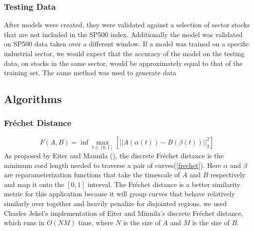 \documentclass{article}
\begin{document}
\subsubsection{Testing Data}
After models were created, they were validated against a selection of sector stocks that are not included in the  SP500 index. Additionally the model was validated on SP500 data taken over a different window. If a model was trained on a specific industrial sector, we would expect that the accuracy of the model on the testing data, on stocks in the same sector, would be approximately equal to that of the training set. The same method was used to generate data 

\subsection{Algorithms}
\subsubsection{Fréchet Distance}
\begin{equation}
    \label{frechet}
    F(A,B) = \inf \max_{t \in [0,1]}\left[||A(\alpha(t))-B(\beta(t))||^2_2 \right]
\end{equation}
As proposed by Eiter and Mannila (\cite{eiter}), the discrete Fréchet distance is the minimum cord length needed to traverse a pair of curves(\ref{frechet}). Here $\alpha$ and $\beta$ are reparameterization functions that take the timescale of $A$ and $B$ respectively and map it onto the $[0,1]$ interval. The Fréchet distance is a better similarity metric for this application because it will group curves that behave relatively similarly over together and heavily penalize for disjointed regions. we used Charles Jekel's implementation of Eiter and Minnila's discrete Fréchet distance, which runs in $O(NM)$ time, where $N$ is the size of $A$ and $M$ is the size of $B$. 
\end{document}

